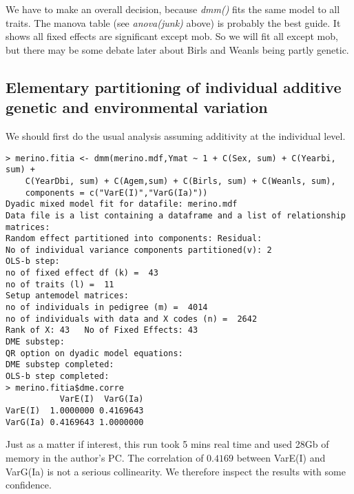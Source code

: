 \documentclass[titlepage]{article}  %
\begin{document}
We have to make an overall decision, because {\em dmm()} fits the same model to all traits.  The manova table (see {\em anova(junk)} above) is probably the best guide. It shows all fixed effects are significant except mob. So we will fit all except mob, but there may be some debate later about Birls and Weanls being partly genetic.

\subsection{Elementary partitioning of individual additive genetic and environmental variation}
We should first do the usual analysis assuming additivity at the individual level.

\begin{verbatim}
> merino.fitia <- dmm(merino.mdf,Ymat ~ 1 + C(Sex, sum) + C(Yearbi, sum) +
    C(YearDbi, sum) + C(Agem,sum) + C(Birls, sum) + C(Weanls, sum),
    components = c("VarE(I)","VarG(Ia)"))
Dyadic mixed model fit for datafile: merino.mdf  
Data file is a list containing a dataframe and a list of relationship matrices:
Random effect partitioned into components: Residual:
No of individual variance components partitioned(v): 2 
OLS-b step:
no of fixed effect df (k) =  43 
no of traits (l) =  11 
Setup antemodel matrices:
no of individuals in pedigree (m) =  4014 
no of individuals with data and X codes (n) =  2642 
Rank of X: 43   No of Fixed Effects: 43 
DME substep:
QR option on dyadic model equations:
DME substep completed:
OLS-b step completed:
> merino.fitia$dme.corre
           VarE(I)  VarG(Ia)
VarE(I)  1.0000000 0.4169643
VarG(Ia) 0.4169643 1.0000000
\end{verbatim}
 Just as a matter if interest, this run took 5 mins real time and used 28Gb of memory in the author's PC. The correlation of $0.4169$ between VarE(I) and VarG(Ia) is not a serious collinearity. We therefore inspect the results with some confidence.
\end{document}
